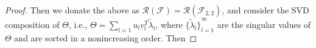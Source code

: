 \documentclass{article}
\def\vx{{\mathbf{x}}}
\def\eE{\mathbb{E}}
\def\defone{\overset{\text{\ding{172}}}{=}}
\begin{document}
\begin{proof}
Then we donate the above as $\mathcal{R}(\mathcal{F}) = \mathcal{R}(\mathcal{F}_{2,2})$, and consider the SVD composition of $\Theta$, i.e., $\Theta = \sum_{l = 1} u_l v_l^T \widetilde{\lambda}_l $, where ${\{\widetilde{\lambda}_l\}}_{l = 1}^{\infty}$ are the singular values of $\Theta$ and are sorted in a nonincreasing order. Then

\end{proof}
\end{document}
